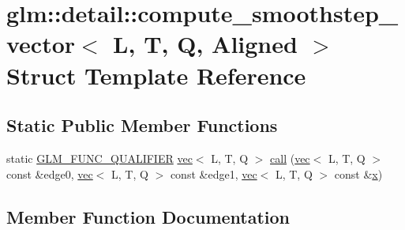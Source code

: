 \hypertarget{structglm_1_1detail_1_1compute__smoothstep__vector}{}\section{glm\+:\+:detail\+:\+:compute\+\_\+smoothstep\+\_\+vector$<$ L, T, Q, Aligned $>$ Struct Template Reference}
\label{structglm_1_1detail_1_1compute__smoothstep__vector}
\subsection*{Static Public Member Functions}
\begin{DoxyCompactItemize}
\item 
static \hyperlink{setup_8hpp_a33fdea6f91c5f834105f7415e2a64407}{G\+L\+M\+\_\+\+F\+U\+N\+C\+\_\+\+Q\+U\+A\+L\+I\+F\+I\+ER} \hyperlink{structglm_1_1vec}{vec}$<$ L, T, Q $>$ \hyperlink{structglm_1_1detail_1_1compute__smoothstep__vector_ab8a7f72b134cbe4bda4a77fe9cb395d6}{call} (\hyperlink{structglm_1_1vec}{vec}$<$ L, T, Q $>$ const \&edge0, \hyperlink{structglm_1_1vec}{vec}$<$ L, T, Q $>$ const \&edge1, \hyperlink{structglm_1_1vec}{vec}$<$ L, T, Q $>$ const \&\hyperlink{_s_d_l__opengl_8h_ad0e63d0edcdbd3d79554076bf309fd47}{x})
\end{DoxyCompactItemize}


\subsection{Member Function Documentation}
\mbox{\label{structglm_1_1detail_1_1compute__smoothstep__vector_ab8a7f72b134cbe4bda4a77fe9cb395d6}} 
